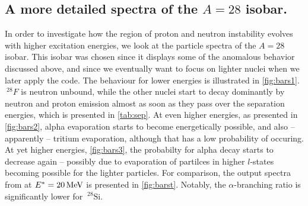 \subsection{A more detailed spectra of the $A=28$ isobar.}
In order to investigate how the region of proton and neutron instability evolves with higher excitation energies, we look at the particle spectra of the $A=28$ isobar. This isobar was chosen since it displays some of the anomalous behavior discussed above, and since we eventually want to focus on lighter nuclei when we later apply the code. The behaviour for lower energies is illustrated in \autoref{fig:bars1}. $~^{28}F$ is neutron unbound, while the other nuclei start to decay dominantly by neutron and proton emission almost as soon as they pass over the separation energies, which is presented in \autoref{tab:sep}. At even higher energies, as presented in \autoref{fig:bars2}, alpha evaporation starts to become energetically possible, and also -- apparently -- tritium evaporation, although that has a low probability of occuring. At yet higher energies, \autoref{fig:bars3}, the probabilty for alpha decay starts to decrease again -- possibly due to evaporation of partilces in higher $l$-states becoming possible for the lighter particles. For comparison, the output spectra from  at $E^*=\unit[20]{MeV}$ is presented in \autoref{fig:barst}. Notably, the $\alpha$-branching ratio is significantly lower for $~^{28}\mathrm{Si}$.

